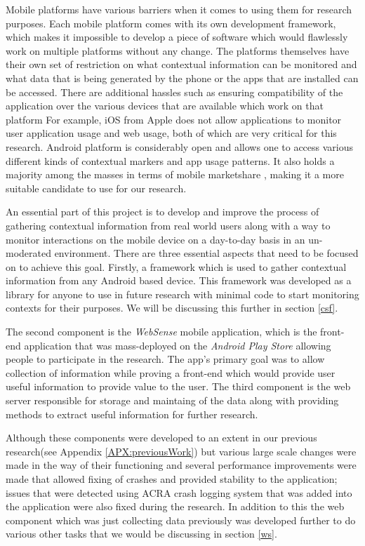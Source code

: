 \documentclass[prodmode,acmtecs]{acmsmall}
\begin{document}
Mobile platforms have various barriers when it comes to using them for research purposes. Each mobile platform comes with its own development framework, which makes it impossible to develop a piece of software which would flawlessly work on multiple platforms without any change. The platforms themselves have their own set of restriction on what contextual information can be monitored and what data that is being generated by the phone or the apps that are installed can be accessed. There are additional hassles such as ensuring compatibility of the application over the various devices that are available which work on that platform For example, iOS from Apple does not allow applications to monitor user application usage and web usage, both of which are very critical for this research. Android platform is considerably open and allows one to access various different kinds of contextual markers and app usage patterns. It also holds a majority among the masses in terms of mobile marketshare \cite{gartnerMobileSurvey2013}, making it a more suitable candidate to use for our research.

An essential part of this project is to develop and improve the process of gathering contextual information from real world users along with a way to monitor interactions on the mobile device on a day-to-day basis in an un-moderated environment. There are three essential aspects that need to be focused on to achieve this goal. Firstly, a framework which is used to gather contextual information from any Android based device. This framework was developed as a library for anyone to use in future research with minimal code to start monitoring contexts for their purposes. We will be discussing this further in section \ref{csf}.

The second component is the \textit{WebSense} mobile application, which is the front-end application that was mass-deployed on the \textit{Android Play Store} allowing people to participate in the research. The app's primary goal was to allow collection of information while proving a front-end which would provide user useful information to provide value to the user. The third component is the web server responsible for storage and maintaing of the data along with providing methods to extract useful information for further research. 

Although these components were developed to an extent in our previous research(see Appendix \ref{APX:previousWork}) but various large scale changes were made in the way of their functioning and several performance improvements were made that allowed fixing of crashes and provided stability to the application; issues that were detected using ACRA crash logging system that was added into the application were also fixed during the research. In addition to this the web component which was just collecting data previously was developed further to do various other tasks that we would be discussing in section \ref{ws}. 
\end{document}
